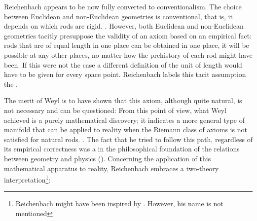 \documentclass[draft]{article}
\begin{document}


Reichenbach appears to be now fully converted to conventionalism. The choice between Euclidean and non-Euclidean geometries is conventional, that is, it depends on which rods are rigid. \citep[366]{Reichenbach1922}. However, both Euclidean and non-Euclidean geometries tacitly presuppose the validity of an axiom based on an empirical fact: rods that are of equal length in one place can be obtained in one place, it will be possible at any other places, no matter how the prehistory of each rod might have been. If this were not the case a different definition of the unit of length would have to be given for every space point. Reichenbach labels this tacit assumption the  \citep[366]{Reichenbach1922}. 

The merit of Weyl is to have shown that this axiom, although quite natural, is not necessary and can be questioned: From this point of view, what Weyl achieved is a purely mathematical discovery; it indicates a more general type of manifold that can be applied to reality when the Riemann class of axioms is not satisfied for natural rods.  \citep[365]{Reichenbach1922a}. The fact that he tried to follow this path, regardless of its empirical correctness was a  in the philosophical foundation of the relations between geometry and physics (\citealp[367f.]{Reichenbach1921}). Concerning the application of this mathematical apparatus to reality, Reichenbach embraces a two-theory interpretation\footnote{Reichenbach might have been inspired by \citet{Pauli1921}. However, his name is not mentioned}:
\end{document}
